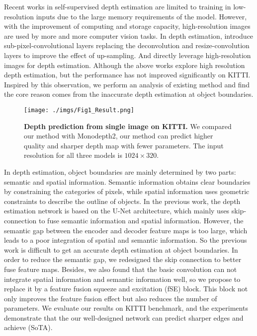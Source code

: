 \documentclass[letterpaper]{article} \usepackage{aaai21}  \usepackage{times}  \usepackage{helvet} \usepackage{courier}  \usepackage[hyphens]{url}  \usepackage{graphicx} \urlstyle{rm} \def\UrlFont{\rm}  \usepackage{natbib}  \usepackage{caption} \frenchspacing  \setlength{\pdfpagewidth}{8.5in}  \setlength{\pdfpageheight}{11in}  \usepackage{booktabs}
\begin{document}
Recent works \citep{zhou2017unsupervised, godard2017unsupervised} in self-supervised depth estimation are limited to training in low-resolution inputs due to the large memory
requirements of the model. However, with the improvement of computing and storage capacity, high-resolution images are used by more and more computer vision tasks. In depth
estimation, \cite{superdepth} introduce sub-pixel-convolutional \cite{shi2016real-time} layers replacing the deconvolution and resize-convolution layers to improve the effect of up-sampling. And 
\cite{godard2019digging} directly leverage high-resolution images for depth estimation. Although the above works explore high resolution depth estimation, but the performance 
has not improved significantly on KITTI. Inspired by this observation, we perform an analysis of existing method and find the core reason comes from the inaccurate depth 
estimation at object boundaries. 

\begin{figure}[t]
    \centering
    \texttt{[image: ./imgs/Fig1\_Result.png]} 
    \caption{\textbf{Depth prediction from single image on KITTI.} We compared our method with Monodepth2\cite{godard2019digging}, our method can 
    predict higher quality and sharper depth map with fewer parameters. The input resolution for all three models is $1024\times320$.}
\label{fig1}
\end{figure}

In depth estimation, object boundaries are mainly determined by two parts: semantic and spatial information. Semantic information obtains clear boundaries by constraining the 
categories of pixels, while spatial information uses geometric constraints to describe the outline of objects. In the previous work, the depth estimation network is based on
the U-Net\cite{ronneberger2015u} architecture, which mainly uses skip-connection to fuse semantic information and spatial information. However, the semantic gap between the encoder and decoder feature
maps is too large, which leads to a poor integration of spatial and semantic information. So the previous work is difficult to get an accurate depth estimation at object boundaries.
In order to reduce the semantic gap, we redesigned the skip connection to better fuse feature maps. Besides, we also found that the basic convolution can not integrate
spatial information and semantic information well, so we propose to replace it by a feature fusion squeeze and excitation (fSE) block. This block not only improves the feature 
fusion effect but also reduces the number of parameters. We evaluate our results on KITTI benchmark, and the experiments demonstrate that the our well-designed network can predict 
sharper edges and achieve (SoTA). 
\end{document}
